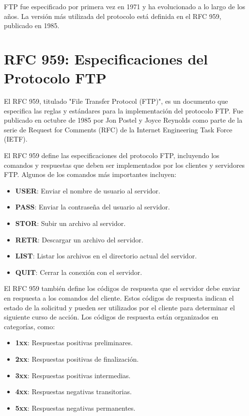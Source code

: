 \documentclass[a4paper, 12pt]{article}
\begin{document}
FTP fue especificado por primera vez en 1971 y ha evolucionado a lo largo de los años. La versión más utilizada del protocolo está definida en el RFC 959, publicado en 1985.

\section{RFC 959: Especificaciones del Protocolo FTP}
El RFC 959, titulado "File Transfer Protocol (FTP)", es un documento que especifica las reglas y estándares para la implementación del protocolo FTP. Fue publicado en octubre de 1985 por Jon Postel y Joyce Reynolds como parte de la serie de Request for Comments (RFC) de la Internet Engineering Task Force (IETF).

El RFC 959 define las especificaciones del protocolo FTP, incluyendo los comandos y respuestas que deben ser implementados por los clientes y servidores FTP. Algunos de los comandos más importantes incluyen:

\begin{itemize}
    \item \textbf{USER}: Enviar el nombre de usuario al servidor.
    \item \textbf{PASS}: Enviar la contraseña del usuario al servidor.
    \item \textbf{STOR}: Subir un archivo al servidor.
    \item \textbf{RETR}: Descargar un archivo del servidor.
    \item \textbf{LIST}: Listar los archivos en el directorio actual del servidor.
    \item \textbf{QUIT}: Cerrar la conexión con el servidor.
\end{itemize}

El RFC 959 también define los códigos de respuesta que el servidor debe enviar en respuesta a los comandos del cliente. Estos códigos de respuesta indican el estado de la solicitud y pueden ser utilizados por el cliente para determinar el siguiente curso de acción. Los códigos de respuesta están organizados en categorías, como:

\begin{itemize}
    \item \textbf{1xx}: Respuestas positivas preliminares.
    \item \textbf{2xx}: Respuestas positivas de finalización.
    \item \textbf{3xx}: Respuestas positivas intermedias.
    \item \textbf{4xx}: Respuestas negativas transitorias.
    \item \textbf{5xx}: Respuestas negativas permanentes.
\end{itemize}
\end{document}
